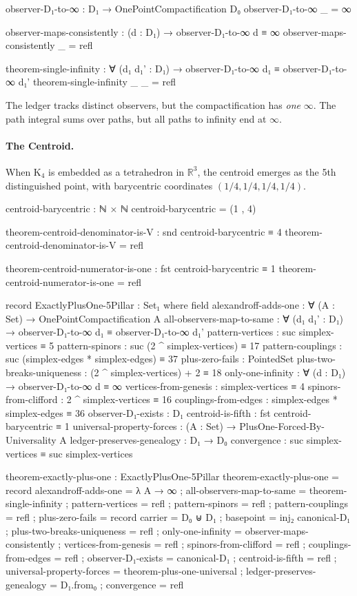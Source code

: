 \documentclass[11pt,a4paper]{book}
\begin{document}
\begin{code}
observer-D₁-to-∞ : D₁ → OnePointCompactification D₀
observer-D₁-to-∞ _ = ∞

observer-maps-consistently : (d : D₁) → observer-D₁-to-∞ d ≡ ∞
observer-maps-consistently _ = refl

theorem-single-infinity : ∀ (d₁ d₁' : D₁) → observer-D₁-to-∞ d₁ ≡ observer-D₁-to-∞ d₁'
theorem-single-infinity _ _ = refl
\end{code}

The ledger tracks distinct observers, but the compactification has \emph{one} 
$\infty$. The path integral sums over paths, but all paths to infinity end at $\infty$.

\paragraph{The Centroid.}
When K$_4$ is embedded as a tetrahedron in $\mathbb{R}^3$, the centroid emerges as 
the 5th distinguished point, with barycentric coordinates $(1/4, 1/4, 1/4, 1/4)$.

\begin{code}
centroid-barycentric : ℕ × ℕ
centroid-barycentric = (1 , 4)

theorem-centroid-denominator-is-V : snd centroid-barycentric ≡ 4
theorem-centroid-denominator-is-V = refl

theorem-centroid-numerator-is-one : fst centroid-barycentric ≡ 1
theorem-centroid-numerator-is-one = refl

record ExactlyPlusOne-5Pillar : Set₁ where
  field
    alexandroff-adds-one : ∀ (A : Set) → OnePointCompactification A
    all-observers-map-to-same : ∀ (d₁ d₁' : D₁) → 
      observer-D₁-to-∞ d₁ ≡ observer-D₁-to-∞ d₁'
    pattern-vertices : suc simplex-vertices ≡ 5
    pattern-spinors : suc (2 ^ simplex-vertices) ≡ 17
    pattern-couplings : suc (simplex-edges * simplex-edges) ≡ 37
    plus-zero-fails : PointedSet
    plus-two-breaks-uniqueness : (2 ^ simplex-vertices) + 2 ≡ 18
    only-one-infinity : ∀ (d : D₁) → observer-D₁-to-∞ d ≡ ∞
    vertices-from-genesis : simplex-vertices ≡ 4
    spinors-from-clifford : 2 ^ simplex-vertices ≡ 16
    couplings-from-edges : simplex-edges * simplex-edges ≡ 36
    observer-D₁-exists : D₁
    centroid-is-fifth : fst centroid-barycentric ≡ 1
    universal-property-forces : (A : Set) → PlusOne-Forced-By-Universality A
    ledger-preserves-genealogy : D₁ → D₀
    convergence : suc simplex-vertices ≡ suc simplex-vertices

theorem-exactly-plus-one : ExactlyPlusOne-5Pillar
theorem-exactly-plus-one = record
  { alexandroff-adds-one = λ A → ∞
  ; all-observers-map-to-same = theorem-single-infinity
  ; pattern-vertices = refl
  ; pattern-spinors = refl
  ; pattern-couplings = refl
  ; plus-zero-fails = record { carrier = D₀ ⊎ D₁ ; basepoint = inj₂ canonical-D₁ }
  ; plus-two-breaks-uniqueness = refl
  ; only-one-infinity = observer-maps-consistently
   ; vertices-from-genesis = refl
  ; spinors-from-clifford = refl
  ; couplings-from-edges = refl
  ; observer-D₁-exists = canonical-D₁
  ; centroid-is-fifth = refl
  ; universal-property-forces = theorem-plus-one-universal
  ; ledger-preserves-genealogy = D₁.from₀
  ; convergence = refl
  }
\end{code}
\end{document}
